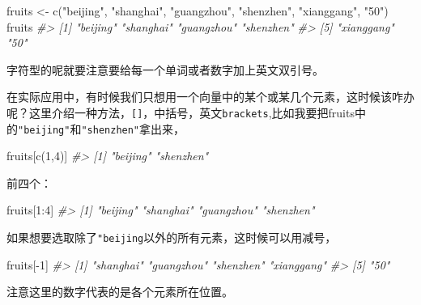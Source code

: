 \documentclass[
]{book}
\newenvironment{Shaded}{\begin{snugshade}}{\end{snugshade}}
\newcommand{\CommentTok}[1]{\textcolor[rgb]{0.56,0.35,0.01}{\textit{#1}}}
\newcommand{\DecValTok}[1]{\textcolor[rgb]{0.00,0.00,0.81}{#1}}
\newcommand{\FunctionTok}[1]{\textcolor[rgb]{0.00,0.00,0.00}{#1}}
\newcommand{\NormalTok}[1]{#1}
\newcommand{\OtherTok}[1]{\textcolor[rgb]{0.56,0.35,0.01}{#1}}
\newcommand{\SpecialCharTok}[1]{\textcolor[rgb]{0.00,0.00,0.00}{#1}}
\newcommand{\StringTok}[1]{\textcolor[rgb]{0.31,0.60,0.02}{#1}}
\begin{document}
\begin{Shaded}
\begin{Highlighting}[]
\NormalTok{fruits }\OtherTok{\textless{}{-}} \FunctionTok{c}\NormalTok{(}\StringTok{"beijing"}\NormalTok{, }\StringTok{"shanghai"}\NormalTok{, }\StringTok{"guangzhou"}\NormalTok{, }\StringTok{"shenzhen"}\NormalTok{, }\StringTok{"xianggang"}\NormalTok{, }\StringTok{"50"}\NormalTok{)}
\NormalTok{fruits}
\CommentTok{\#\textgreater{} [1] "beijing"   "shanghai"  "guangzhou" "shenzhen" }
\CommentTok{\#\textgreater{} [5] "xianggang" "50"}
\end{Highlighting}
\end{Shaded}

字符型的呢就要注意要给每一个单词或者数字加上英文双引号。

在实际应用中，有时候我们只想用一个向量中的某个或某几个元素，这时候该咋办呢？这里介绍一种方法，\texttt{{[}{]}}，中括号，英文\texttt{brackets},比如我要把fruits中的\texttt{"beijing"}和\texttt{"shenzhen"}拿出来，

\begin{Shaded}
\begin{Highlighting}[]
\NormalTok{fruits[}\FunctionTok{c}\NormalTok{(}\DecValTok{1}\NormalTok{,}\DecValTok{4}\NormalTok{)]}
\CommentTok{\#\textgreater{} [1] "beijing"  "shenzhen"}
\end{Highlighting}
\end{Shaded}

前四个：

\begin{Shaded}
\begin{Highlighting}[]
\NormalTok{fruits[}\DecValTok{1}\SpecialCharTok{:}\DecValTok{4}\NormalTok{]}
\CommentTok{\#\textgreater{} [1] "beijing"   "shanghai"  "guangzhou" "shenzhen"}
\end{Highlighting}
\end{Shaded}

如果想要选取除了\texttt{"beijing}以外的所有元素，这时候可以用减号，

\begin{Shaded}
\begin{Highlighting}[]
\NormalTok{fruits[}\SpecialCharTok{{-}}\DecValTok{1}\NormalTok{]}
\CommentTok{\#\textgreater{} [1] "shanghai"  "guangzhou" "shenzhen"  "xianggang"}
\CommentTok{\#\textgreater{} [5] "50"}
\end{Highlighting}
\end{Shaded}

注意这里的数字代表的是各个元素所在位置。
\end{document}
